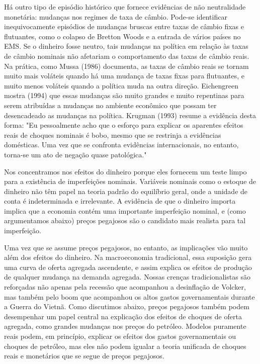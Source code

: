 \documentclass[a4paper,12pt]{article}[abntex2]
\begin{document}
Há outro tipo de episódio histórico que fornece evidências de não neutralidade monetária: mudanças nos regimes de taxa de câmbio. Pode-se identificar inequivocamente episódios de mudanças bruscas entre taxas de câmbio fixas e flutuantes, como o colapso de Bretton Woods e a entrada de vários países no EMS. Se o dinheiro fosse neutro, tais mudanças na política em relação às taxas de câmbio nominais não afetariam o comportamento das taxas de câmbio reais. Na prática, como Mussa (1986) documenta, as taxas de câmbio reais se tornam muito mais voláteis quando há uma mudança de taxas fixas para flutuantes, e muito menos voláteis quando a política muda na outra direção. Eichengreen mostra (1994) que essas mudanças são muito grandes e muito repentinas para serem atribuídas a mudanças no ambiente econômico que possam ter desencadeado as mudanças na política. Krugman (1993) resume a evidência desta forma: "Eu pessoalmente acho que o esforço para explicar os aparentes efeitos reais de choques nominais é bobo, mesmo que se restrinja a evidências domésticas. Uma vez que se confronta evidências internacionais, no entanto, torna-se um ato de negação quase patológica."

Nos concentramos nos efeitos do dinheiro porque eles fornecem um teste limpo para a existência de imperfeições nominais. Variáveis nominais como o estoque de dinheiro não têm papel na teoria padrão do equilíbrio geral, onde a unidade de conta é indeterminada e irrelevante. A evidência de que o dinheiro importa implica que a economia contém uma importante imperfeição nominal, e (como argumentamos abaixo) preços pegajosos são o candidato mais realista para tal imperfeição.

Uma vez que se assume preços pegajosos, no entanto, as implicações vão muito além dos efeitos do dinheiro. Na macroeconomia tradicional, essa suposição gera uma curva de oferta agregada ascendente, e assim explica os efeitos de produção de qualquer mudança na demanda agregada. Nossas crenças tradicionalistas são reforçadas não apenas pela recessão que acompanhou a desinflação de Volcker, mas também pelo boom que acompanhou os altos gastos governamentais durante a Guerra do Vietnã. Como discutimos abaixo, preços pegajosos também podem desempenhar um papel central na explicação dos efeitos de choques de oferta agregada, como grandes mudanças nos preços do petróleo. Modelos puramente reais podem, em princípio, explicar os efeitos dos gastos governamentais ou choques de petróleo, mas eles não podem igualar a teoria unificada de choques reais e monetários que se segue de preços pegajosos.
\end{document}
